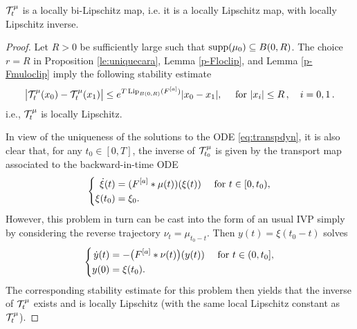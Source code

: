 \begin{proposition}\label{p-transportlip}
$\mathcal{T}^\mu_t$ is a locally bi-Lipschitz map, i.e. it is a locally Lipschitz map, with locally Lipschitz inverse.
\end{proposition}
\begin{proof}
	
	Let $R>0$ be sufficiently large such that $\operatorname{supp}(\mu_0)\subseteq B(0,R)$.
 The choice $r = R$ in Proposition \ref{le:uniquecara},  Lemma \ref{p-Floclip}, and  Lemma \ref{p-Fmuloclip}  imply the following stability estimate
	\begin{align}\label{eq:liptrans}
		\bigl|\mathcal{T}^\mu_t(x_0)-\mathcal{T}^\mu_t(x_1)\bigr|
			\leq e^{T\,\textup{Lip}_{B(0,R)}(F^{[a]})}|x_0-x_1|,\quad \text{ for } |x_i|\leq R\,,\quad i=0,1\,.
	\end{align}
	i.e., $\mathcal{T}^\mu_t$ is locally Lipschitz.
	
	In view of the uniqueness of the solutions to the ODE \eqref{eq:transpdyn}, it is also clear that, for any $t_0\in [0,T]$, the inverse of $\mathcal{T}^\mu_{t_0}$ is
	given by the transport map associated to the backward-in-time ODE
\begin{align*}
\left\{\begin{aligned}
\dot{\xi}(t) &= (F^{[a]}*\mu(t))(\xi(t)) \quad \text{ for } t \in [0,t_0),\\
\xi(t_0) &= \xi_0.
\end{aligned}\right.
\end{align*}
	However, this problem in turn can be cast into the form of an usual IVP simply by considering the reverse trajectory $\nu_t=\mu_{t_0-t}$. Then
	$y(t)=\xi(t_0-t)$ solves
	\begin{align*}
	\left\{\begin{aligned}
		\dot y(t)&=-\bigl(F^{[a]}\ast\nu(t)\bigr)(y(t))  \quad \text{ for } t \in (0,t_0], \\
		y(0) &= \xi(t_0).
	\end{aligned}\right.
	\end{align*}
	The corresponding stability estimate for this problem then yields that the inverse of $\mathcal{T}^\mu_t$ exists and is locally Lipschitz (with the same local Lipschitz constant as $\mathcal{T}^\mu_t$).
\end{proof}



